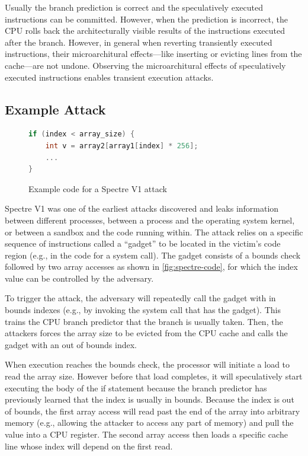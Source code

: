 Usually the branch prediction is correct and the speculatively executed instructions can be committed.
However, when the prediction is incorrect, the CPU rolls back the architecturally visible results of the instructions executed after the branch.
However, in general when reverting transiently executed instructions, their microarchitural effects---like inserting or evicting lines from the cache---are not undone.
Observing the  microarchitural effects of speculatively executed instructions enables transient execution attacks.

\subsection{Example Attack}
\begin{figure}[h]
\begin{lstlisting}[language=C, style=codeStyle]
if (index < array_size) {
    int v = array2[array1[index] * 256];
    ...
}
\end{lstlisting}
\caption{Example code for a Spectre V1 attack}
\label{fig:spectre-code}
\end{figure}
Spectre V1 was one of the earliest attacks discovered and leaks information between different processes, between a process and the operating system kernel, or between a sandbox and the code running within.
The attack relies on a specific sequence of instructions called a ``gadget'' to be located in the victim's code region (e.g., in the code for a system call).
The gadget consists of a bounds check followed by two array accesses as shown in \autoref{fig:spectre-code}, for which the index value can be controlled by the adversary.

To trigger the attack, the adversary will repeatedly call the gadget with in bounds indexes (e.g., by invoking the system call that has the gadget).
This trains the CPU branch predictor that the branch is usually taken.
Then, the attackers forces the array size to be evicted from the CPU cache and calls the gadget with an out of bounds index.

When execution reaches the bounds check, the processor will initiate a load to read the array size.
However before that load completes, it will speculatively start executing the body of the if statement because the branch predictor has previously learned that the index is usually in bounds.
Because the index is out of bounds, the first array access will read past the end of the array into arbitrary memory (e.g., allowing the attacker to access any part of memory) and pull the value into a CPU register.
The second array access then loads a specific cache line whose index will depend on the first read.

